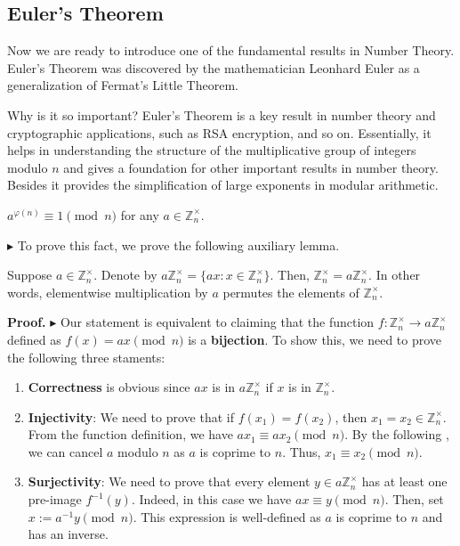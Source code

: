 \documentclass[../lecture-notes-148x210.tex]{subfiles}
\begin{document}
\subsection{Euler's Theorem}
Now we are ready to introduce one of the fundamental results in Number Theory.
Euler's Theorem was discovered by the mathematician Leonhard Euler 
as a generalization of Fermat's Little Theorem.

Why is it so important? Euler's Theorem is a key result in number theory and 
cryptographic applications, such as RSA encryption, and so on. 
Essentially, it helps in understanding the structure of the multiplicative group of 
integers modulo $n$ and gives a foundation for other important results in number theory. 
Besides it provides the simplification of large exponents in modular arithmetic. 

\begin{theorem}[Euler's] \label{th:euler_theorem}
    $a^{\varphi(n)} \equiv 1 \pmod{n}$ for any $a \in \mathbb{Z}_n^{\times}$.
\end{theorem}

$\blacktriangleright$ To prove this fact, we prove the following auxiliary lemma.

\begin{lemma}
    Suppose $a \in \mathbb{Z}_n^{\times}$. Denote by $a\mathbb{Z}_n^{\times} =
    \{ax: x \in \mathbb{Z}_n^{\times}\}$. Then, $\mathbb{Z}_n^{\times} =
    a\mathbb{Z}_n^{\times}$. In other words, elementwise multiplication by $a$
    permutes the elements of $\mathbb{Z}_n^{\times}$.
\end{lemma}

\textbf{Proof.} $\blacktriangleright$ Our statement is equivalent to claiming that the 
function $f: \mathbb{Z}_n^{\times} \to a\mathbb{Z}_n^{\times}$ defined 
as $f(x) = ax \pmod{n}$ is a \textbf{bijection}. To show this, we need to prove the following 
three staments:
\begin{enumerate}
    \item \textbf{Correctness} is obvious since $ax$ is in $a\mathbb{Z}_n^{\times}$ if $x$ is in $\mathbb{Z}_n^{\times}$.
    \item \textbf{Injectivity}: We need to prove that if $f(x_1)=f(x_2)$, 
    then $x_1=x_2 \in \mathbb{Z}_n^{\times}$. 
    From the function definition, we have $ax_1 \equiv ax_2 \pmod{n}$. By the following 
    , we can cancel $a$ modulo $n$ as $a$ is coprime to $n$. 
    Thus, $x_1 \equiv x_2 \pmod{n}$.
    \item \textbf{Surjectivity}: We need to prove that every element $y \in a\mathbb{Z}_n^{\times}$ has at least 
    one pre-image $f^{-1}(y)$. Indeed, in this case we have $ax \equiv y \pmod{n}$. Then, set $x := a^{-1}y \pmod {n}$. This 
    expression is well-defined as $a$ is coprime to $n$ and has an inverse.
\end{enumerate}
\end{document}

